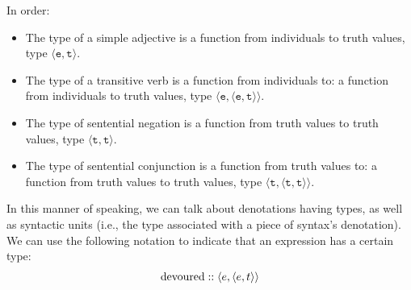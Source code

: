 \documentclass{article}
\newcommand{\ab}[1]{\ensuremath{\langle #1 \rangle}}
\begin{document}
In order:
\begin{itemize}
  \item
    The type of a simple adjective is a function from individuals to truth
    values, type \ab{\texttt{e}, \texttt{t}}. 

  \item
    The type of a transitive verb is a function from individuals to: a function
    from individuals to truth values, type \ab{\texttt{e}, \ab{\texttt{e},
    \texttt{t}}}. 

  \item
    The type of sentential negation is a function from truth values to truth
    values, type \ab{\texttt{t}, \texttt{t}}.
    
  \item
    The type of sentential conjunction is a function from truth values to: a
    function from truth values to truth values, type \ab{\texttt{t},
    \ab{\texttt{t}, \texttt{t}}}.
\end{itemize}

In this manner of speaking, we can talk about denotations having types, as well
as syntactic units (i.e., the type associated with a piece of syntax's
denotation). We can use the following notation to indicate that an expression
has a certain type:
\begin{align}
  \notag
  \text{devoured} :: \ab{e, \ab{e, t}}
\end{align}
\end{document}
